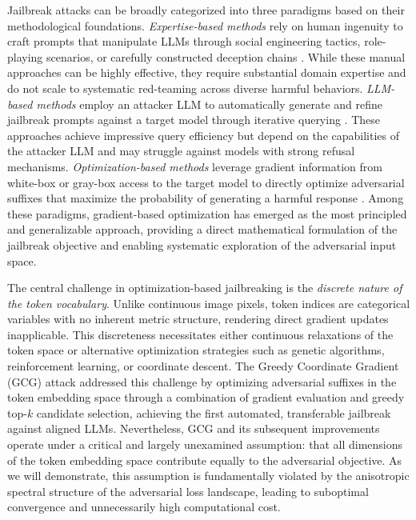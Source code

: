 ﻿\documentclass[lettersize,journal]{IEEEtran}
\begin{document}
Jailbreak attacks can be broadly categorized into three paradigms based on their methodological foundations. \textit{Expertise-based methods} rely on human ingenuity to craft prompts that manipulate LLMs through social engineering tactics, role-playing scenarios, or carefully constructed deception chains \cite{zeng2024persuasion}. While these manual approaches can be highly effective, they require substantial domain expertise and do not scale to systematic red-teaming across diverse harmful behaviors. \textit{LLM-based methods} employ an attacker LLM to automatically generate and refine jailbreak prompts against a target model through iterative querying \cite{chao2023jailbreaking, mehrotra2023tree}. These approaches achieve impressive query efficiency but depend on the capabilities of the attacker LLM and may struggle against models with strong refusal mechanisms. \textit{Optimization-based methods} leverage gradient information from white-box or gray-box access to the target model to directly optimize adversarial suffixes that maximize the probability of generating a harmful response \cite{zou2023universal, jia2024improved, zhu2023autodan}. Among these paradigms, gradient-based optimization has emerged as the most principled and generalizable approach, providing a direct mathematical formulation of the jailbreak objective and enabling systematic exploration of the adversarial input space.

The central challenge in optimization-based jailbreaking is the \textit{discrete nature of the token vocabulary}. Unlike continuous image pixels, token indices are categorical variables with no inherent metric structure, rendering direct gradient updates inapplicable. This discreteness necessitates either continuous relaxations of the token space or alternative optimization strategies such as genetic algorithms, reinforcement learning, or coordinate descent. The Greedy Coordinate Gradient (GCG) attack \cite{zou2023universal} addressed this challenge by optimizing adversarial suffixes in the token embedding space through a combination of gradient evaluation and greedy top-$k$ candidate selection, achieving the first automated, transferable jailbreak against aligned LLMs. Nevertheless, GCG and its subsequent improvements operate under a critical and largely unexamined assumption: that all dimensions of the token embedding space contribute equally to the adversarial objective. As we will demonstrate, this assumption is fundamentally violated by the anisotropic spectral structure of the adversarial loss landscape, leading to suboptimal convergence and unnecessarily high computational cost.
\end{document}
